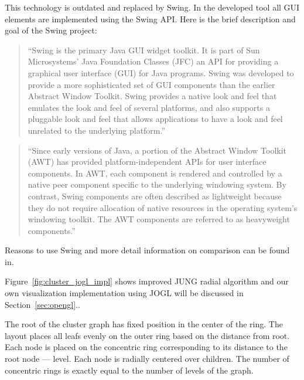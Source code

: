 This technology is outdated and replaced by Swing. In the developed tool all GUI elements are implemented using the Swing API. Here is the brief description and goal of the Swing project:

\begin{quotation}
``Swing is the primary Java GUI widget toolkit. It is part of Sun Microsystems' Java Foundation Classes (JFC)
an API for providing a graphical user interface (GUI) for Java programs.
Swing was developed to provide a more sophisticated set of GUI components than the earlier Abstract Window Toolkit.
Swing provides a native look and feel that emulates the look and feel of several platforms,
and also supports a pluggable look and feel that allows applications to have a look and feel unrelated to the underlying platform.''~\cite{JAVA_SWING}
\end{quotation}

\begin{quotation}
``Since early versions of Java, a portion of the Abstract Window Toolkit (AWT) has provided platform-independent APIs for user interface components.
In AWT, each component is rendered and controlled by a native peer component specific to the underlying windowing system.
By contrast, Swing components are often described as lightweight because they do not require allocation of native resources in the operating system's windowing toolkit.
The AWT components are referred to as heavyweight components.''~\cite{JAVA_SWING}
\end{quotation}

Reasons to use Swing and more detail information on comparison can be found in.~\cite{AWT_VS_SWING}


Figure~\ref{fig:cluster_jogl_impl} shows improved JUNG radial algorithm and our own visualization implementation using JOGL will be discussed in Section~\ref{sec:opengl}..

The root of the cluster graph has fixed position in the center of the ring. The layout places all leafs evenly on the outer ring based on the distance from root.
Each node is placed on the concentric ring corresponding to its distance to the root node --- level. Each node is radially centered over children.
The number of concentric rings is exactly equal to the number of levels of the graph.


